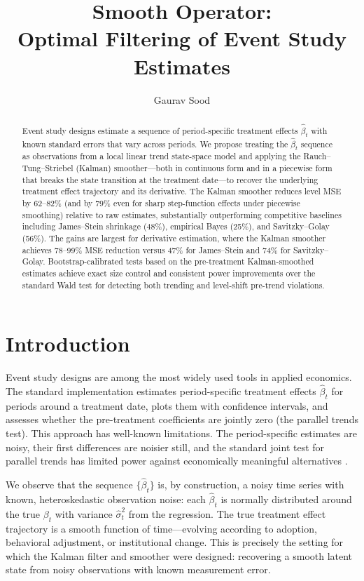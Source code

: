 \documentclass[12pt]{article}
\title{\textbf{Smooth Operator:}\\ Optimal Filtering of Event Study Estimates}
\author{Gaurav Sood}
\date{}
\begin{document}
\maketitle

\begin{abstract}
Event study designs estimate a sequence of period-specific treatment effects $\hat{\beta}_t$ with known standard errors that vary across periods. We propose treating the $\hat{\beta}_t$ sequence as observations from a local linear trend state-space model and applying the Rauch--Tung--Striebel (Kalman) smoother---both in continuous form and in a piecewise form that breaks the state transition at the treatment date---to recover the underlying treatment effect trajectory and its derivative. The Kalman smoother reduces level MSE by 62--82\% (and by 79\% even for sharp step-function effects under piecewise smoothing) relative to raw estimates, substantially outperforming competitive baselines including James--Stein shrinkage (48\%), empirical Bayes (25\%), and Savitzky--Golay (56\%). The gains are largest for derivative estimation, where the Kalman smoother achieves 78--99\% MSE reduction versus 47\% for James--Stein and 74\% for Savitzky--Golay. Bootstrap-calibrated tests based on the pre-treatment Kalman-smoothed estimates achieve exact size control and consistent power improvements over the standard Wald test for detecting both trending and level-shift pre-trend violations.
\end{abstract}

\section{Introduction}

Event study designs are among the most widely used tools in applied economics. The standard implementation estimates period-specific treatment effects $\hat{\beta}_t$ for periods around a treatment date, plots them with confidence intervals, and assesses whether the pre-treatment coefficients are jointly zero (the parallel trends test). This approach has well-known limitations. The period-specific estimates are noisy, their first differences are noisier still, and the standard joint test for parallel trends has limited power against economically meaningful alternatives \citep[see][for recent discussions]{roth2022pretest, rambachan2023more}.

We observe that the sequence $\{\hat{\beta}_t\}$ is, by construction, a noisy time series with known, heteroskedastic observation noise: each $\hat{\beta}_t$ is normally distributed around the true $\beta_t$ with variance $\hat{\sigma}^2_t$ from the regression. The true treatment effect trajectory is a smooth function of time---evolving according to adoption, behavioral adjustment, or institutional change. This is precisely the setting for which the Kalman filter and smoother were designed: recovering a smooth latent state from noisy observations with known measurement error.
\end{document}
